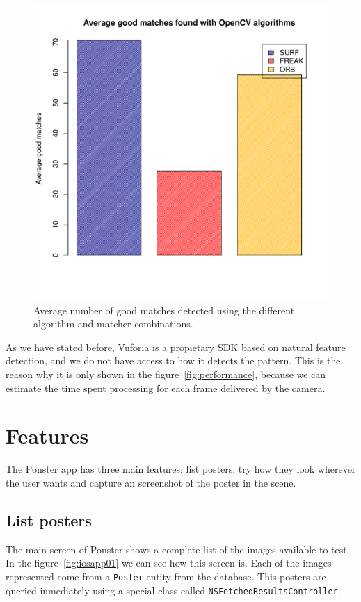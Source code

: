 \begin{figure}
\centering
\includegraphics[scale=0.75]{performance/goodmatches.pdf}
\caption{\label{fig:goodmatches} Average number of good matches detected using the
  different algorithm and matcher combinations.}
\end{figure} 

As we have stated before, Vuforia is a propietary SDK based on natural feature
detection, and we do not have access to how it detects the pattern. This is the
reason why it is only shown in the figure~\ref{fig:performance}, because we can
estimate the time spent processing for each frame delivered by the camera.

\section{Features}
The Ponster app has three main features: list posters, try how they look wherever
the user wants and capture an screenshot of the poster in the scene. 

\subsection*{List posters}
The main screen of Ponster shows a complete list of the images available to
test. In the figure~\ref{fig:iosapp01} we can see how this screen is. Each of
the images represented come from a \texttt{Poster} entity from the
database. This posters are queried inmediately using a special class called
\texttt{NS\-Fetched\-Results\-Controller}. 

